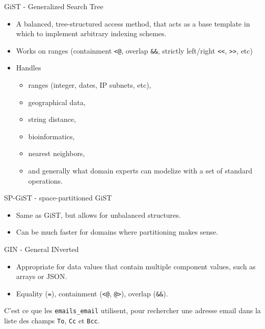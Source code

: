 \documentclass{beamer}
\begin{document}
\begin{frame}{GiST - Generalized Search Tree}
    \begin{itemize}
        \item A balanced, tree-structured access method, that acts as a base template in which to implement arbitrary indexing schemes.
        \item Works on ranges (containment \texttt{<@}, overlap \texttt{\&\&}, strictly left/right \texttt{<<}, \texttt{>>}, etc)
        \item Handles
            \begin{itemize}
                \item ranges (integer, dates, IP subnets, etc),
                \item geographical data,
                \item string distance,
                \item bioinformatics,
                \item nearest neighbors,
                \item and generally what domain experts can modelize with a set of standard operations.
            \end{itemize}
    \end{itemize}
\end{frame}

\begin{frame}{SP-GiST - space-partitioned GiST}
    \begin{itemize}
        \item Same as GiST, but allows for unbalanced structures.
        \item Can be much faster for domains where partitioning makes sense.
    \end{itemize}
\end{frame}

\begin{frame}{GIN - General INverted}
    \begin{itemize}
        \item Appropriate for data values that contain multiple component values, such as arrays or JSON.
        \item Equality (\texttt{=}), containment (\texttt{<@}, \texttt{@>}), overlap (\texttt{\&\&}).
    \end{itemize}

    \Rightarrow \hspace{5pt} C'est ce que les \texttt{emails\_email} utilisent, pour rechercher une adresse email dans la liste des champs \texttt{To}, \texttt{Cc} et \texttt{Bcc}.
\end{frame}
\end{document}
